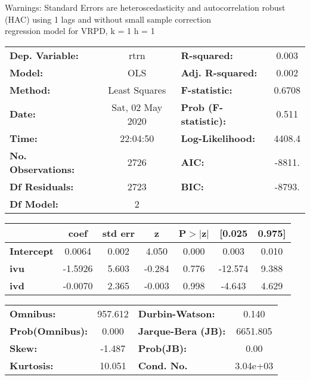 Warnings: \newline
 [1] Standard Errors are heteroscedasticity and autocorrelation robust (HAC) using 1 lags and without small sample correction\\ 

regression model for VRPD, k = 1 h = 1\begin{center}
\begin{tabular}{lclc}
\toprule
\textbf{Dep. Variable:}    &       rtrn       & \textbf{  R-squared:         } &     0.003   \\
\textbf{Model:}            &       OLS        & \textbf{  Adj. R-squared:    } &     0.002   \\
\textbf{Method:}           &  Least Squares   & \textbf{  F-statistic:       } &    0.6708   \\
\textbf{Date:}             & Sat, 02 May 2020 & \textbf{  Prob (F-statistic):} &    0.511    \\
\textbf{Time:}             &     22:04:50     & \textbf{  Log-Likelihood:    } &    4408.4   \\
\textbf{No. Observations:} &        2726      & \textbf{  AIC:               } &    -8811.   \\
\textbf{Df Residuals:}     &        2723      & \textbf{  BIC:               } &    -8793.   \\
\textbf{Df Model:}         &           2      & \textbf{                     } &             \\
\bottomrule
\end{tabular}
\begin{tabular}{lcccccc}
                   & \textbf{coef} & \textbf{std err} & \textbf{z} & \textbf{P$> |$z$|$} & \textbf{[0.025} & \textbf{0.975]}  \\
\midrule
\textbf{Intercept} &       0.0064  &        0.002     &     4.050  &         0.000        &        0.003    &        0.010     \\
\textbf{ivu}       &      -1.5926  &        5.603     &    -0.284  &         0.776        &      -12.574    &        9.388     \\
\textbf{ivd}       &      -0.0070  &        2.365     &    -0.003  &         0.998        &       -4.643    &        4.629     \\
\bottomrule
\end{tabular}
\begin{tabular}{lclc}
\textbf{Omnibus:}       & 957.612 & \textbf{  Durbin-Watson:     } &    0.140  \\
\textbf{Prob(Omnibus):} &   0.000 & \textbf{  Jarque-Bera (JB):  } & 6651.805  \\
\textbf{Skew:}          &  -1.487 & \textbf{  Prob(JB):          } &     0.00  \\
\textbf{Kurtosis:}      &  10.051 & \textbf{  Cond. No.          } & 3.04e+03  \\
\bottomrule
\end{tabular}
\end{center}

